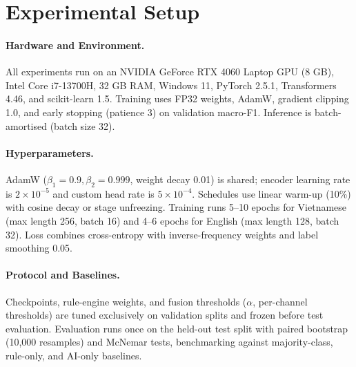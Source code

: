 \section{Experimental Setup}
\label{sec:setup}

\paragraph{Hardware and Environment.}
All experiments run on an NVIDIA GeForce RTX 4060 Laptop GPU (8 GB), Intel Core i7-13700H, 32 GB RAM, Windows 11, PyTorch 2.5.1, Transformers 4.46, and scikit-learn 1.5. Training uses FP32 weights, AdamW, gradient clipping 1.0, and early stopping (patience 3) on validation macro-F1. Inference is batch-amortised (batch size 32).

\paragraph{Hyperparameters.}
AdamW ($\beta_1=0.9, \beta_2=0.999$, weight decay 0.01) is shared; encoder learning rate is $2\times10^{-5}$ and custom head rate is $5\times10^{-4}$. Schedules use linear warm-up (10\%) with cosine decay or stage unfreezing. Training runs 5--10 epochs for Vietnamese (max length 256, batch 16) and 4--6 epochs for English (max length 128, batch 32). Loss combines cross-entropy with inverse-frequency weights and label smoothing 0.05.

\paragraph{Protocol and Baselines.}
Checkpoints, rule-engine weights, and fusion thresholds ($\alpha$, per-channel thresholds) are tuned exclusively on validation splits and frozen before test evaluation. Evaluation runs once on the held-out test split with paired bootstrap (10,000 resamples) and McNemar tests, benchmarking against majority-class, rule-only, and AI-only baselines.